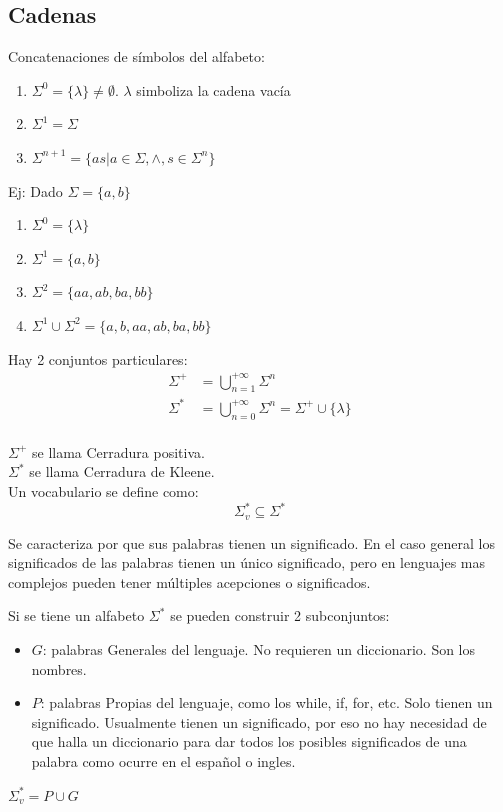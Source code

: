 \subsection{Cadenas}
Concatenaciones de símbolos del alfabeto:
\begin{enumerate}
    \item $\Sigma ^ 0 = \{\lambda\} \neq \emptyset$. $\lambda$ simboliza la cadena vacía
    \item $\Sigma ^ 1 = \Sigma$
    \item $\Sigma ^{n+1} = \{as|a\in\Sigma, \wedge, s\in\Sigma^n\}$
\end{enumerate}
Ej:
Dado $\Sigma = \{a,b\}$
\begin{enumerate}
    \item $\Sigma ^ 0 = \{\lambda\}$
    \item $\Sigma ^ 1 = \{a,b\}$
    \item $\Sigma ^ 2 = \{aa, ab, ba, bb\}$
    \item $\Sigma ^ 1 \cup \Sigma ^ 2 = \{a, b, aa, ab, ba, bb\}$
\end{enumerate}
Hay 2 conjuntos particulares:\\
\begin{align*}
    \Sigma^+ &= \bigcup^{+\infty}_{n = 1}\Sigma^n\\
    \Sigma^* &= \bigcup^{+\infty}_{n = 0}\Sigma^n = \Sigma^+\cup\{\lambda\} \\
\end{align*}

$\Sigma^+$ se llama Cerradura positiva.\\
$\Sigma^*$ se llama Cerradura de Kleene.\\

Un vocabulario se define como:
\[
    \Sigma^*_v \subseteq \Sigma^*
\]

Se caracteriza por que sus palabras tienen un significado. En el caso general los significados de las palabras tienen un único significado, pero en lenguajes mas complejos pueden tener múltiples acepciones o significados.

Si se tiene un alfabeto $\Sigma^*$ se pueden construir 2 subconjuntos:
\begin{itemize}
    \item $G$: palabras Generales del lenguaje. No requieren un diccionario. Son los nombres. 
    \item $P$: palabras Propias del lenguaje, como los while, if, for, etc. Solo tienen un significado. Usualmente tienen un significado, por eso no hay necesidad de que halla un diccionario para dar todos los posibles significados de una palabra como ocurre en el español o ingles.
    
\end{itemize}
$\Sigma^*_v=P\cup G$\\

